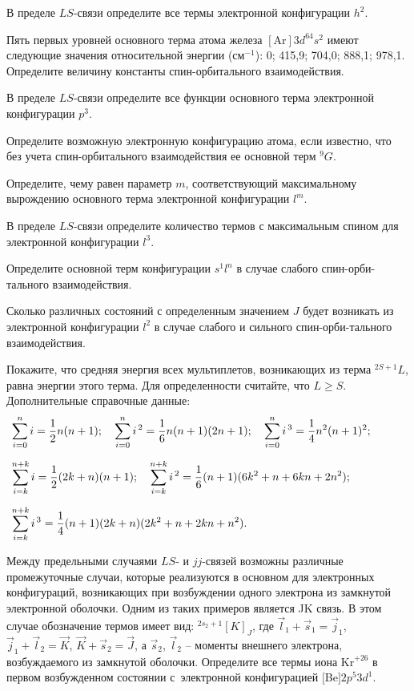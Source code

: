 \par
{} В пределе $LS$-связи определите все термы электронной конфигурации $h^2$.
\par
{} Пять первых уровней основного терма атома железа $[\text{Ar}]3d^64s^2$ имеют следующие значения относительной энергии (см$^{-1}$): 0; 415,9; 704,0; 888,1; 978,1. Определите величину константы спин-орбитального взаимодействия.
\par
{} В пределе $LS$-связи определите все функции основного терма электронной конфигурации $p^3$.
\par
{} Определите возможную электронную конфигурацию атома, если известно, что без учета спин-орбитального взаимодействия ее основной терм $^9G$.
\par
{} Определите, чему равен параметр $m$, соответствующий максимальному вырождению основного терма электронной конфигурации $l^m$.
\par
{} В пределе $LS$-связи определите количество термов с максимальным спином для электронной конфигурации $l^3$.
\par
{} Определите основной терм конфигурации $s^1l^n$ в случае слабого спин-орби-тального взаимодействия.
\par
{} Сколько различных состояний с определенным значением $J$ будет возникать из электронной конфигурации $l^2$ в случае слабого и сильного спин-орби-тального взаимодействия.
\par
{} Покажите, что средняя энергия всех мультиплетов, возникающих из терма $^{2S+1}L$, равна энергии этого терма. Для определенности считайте, что $L\ge S$. Дополнительные справочные данные:
\begin{equation*}
\begin{aligned}
&\sum_{i=0}^{n} i = \frac{1}{2}n(n+1);\quad \sum_{i=0}^{n} i^{\,2} = \frac{1}{6}n(n+1)(2n+1);\quad \sum_{i=0}^{n} i^{\,3} = \frac{1}{4}n^2(n+1)^2;\hspace{11mm}
\\[6pt]
 &\sum_{i=k}^{n+k} i = \frac{1}{2}(2k+n)(n+1);\quad \sum_{i=k}^{n+k} i^{\,2} = \frac{1}{6}(n+1)(6k^2+n+6kn+2n^2);\,
 \\[6pt]
&\sum_{i=k}^{n+k} i^{\,3} = \frac{1}{4}(n+1)(2k+n)(2k^2+n+2kn+n^2).
\end{aligned}
\end{equation*}
\par
{} Между предельными случаями $LS$- и $jj$-связей возможны различные промежуточные случаи, которые реализуются в основном для электронных конфигураций, возникающих при возбуждении одного электрона из замкнутой электронной оболочки. Одним из таких примеров является JK связь. В этом случае обозначение термов имеет вид: $^{2s_2+1}[K]_J$, где $\vec{l}_1+\vec{s}_1=\vec{j}_1$, $\vec{j}_1+\vec{l}_2=\vec{K}$, $\vec{K}+\vec{s}_2=\vec{J}$, а $\vec{s}_2$, $\vec{l}_2$ – моменты внешнего электрона, возбуждаемого из замкнутой оболочки. Определите все термы иона $\text{Kr}^{+26}$ в первом возбужденном состоянии с~электронной конфигурацией $[$Be$]2p^5 3d^1$.
